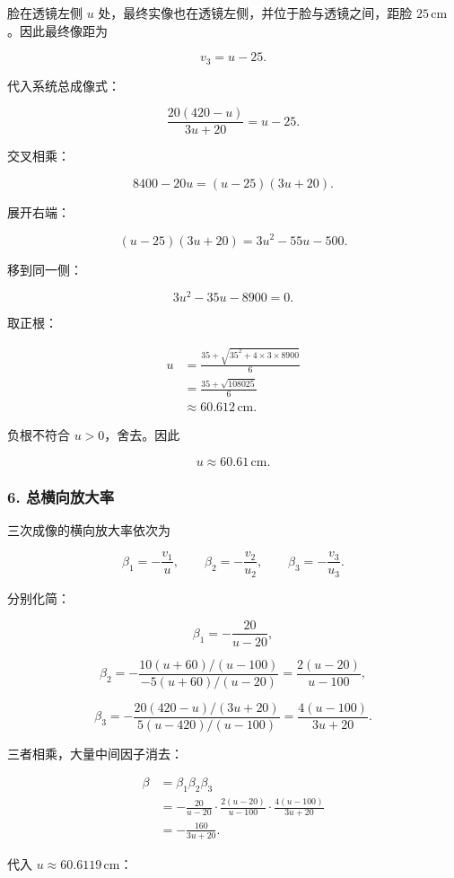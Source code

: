 \documentclass[12pt,a4paper,UTF8]{ctexart}
\begin{document}
脸在透镜左侧 \(u\) 处，最终实像也在透镜左侧，并位于脸与透镜之间，距脸
\(25\,\mathrm{cm}\)。因此最终像距为

\[
v_3=u-25.
\]

代入系统总成像式：

\[
\frac{20(420-u)}{3u+20}=u-25.
\]

交叉相乘：

\[
8400-20u=(u-25)(3u+20).
\]

展开右端：

\[
(u-25)(3u+20)=3u^2-55u-500.
\]

移到同一侧：

\[
3u^2-35u-8900=0.
\]

取正根：

\[
\begin{aligned}
u
&=\frac{35+\sqrt{35^2+4\times3\times8900}}{6}\\
&=\frac{35+\sqrt{108025}}{6}\\
&\approx60.612\,\mathrm{cm}.
\end{aligned}
\]

负根不符合 \(u>0\)，舍去。因此

\[
\boxed{u\approx60.61\,\mathrm{cm}}.
\]

\subsubsection{6.
总横向放大率}\label{ux603bux6a2aux5411ux653eux5927ux7387}

三次成像的横向放大率依次为

\[
\beta_1=-\frac{v_1}{u},
\qquad
\beta_2=-\frac{v_2}{u_2},
\qquad
\beta_3=-\frac{v_3}{u_3}.
\]

分别化简：

\[
\beta_1=-\frac{20}{u-20},
\]

\[
\beta_2
=-\frac{10(u+60)/(u-100)}{-5(u+60)/(u-20)}
=\frac{2(u-20)}{u-100},
\]

\[
\beta_3
=-\frac{20(420-u)/(3u+20)}{5(u-420)/(u-100)}
=\frac{4(u-100)}{3u+20}.
\]

三者相乘，大量中间因子消去：

\[
\begin{aligned}
\beta
&=\beta_1\beta_2\beta_3\\
&=-\frac{20}{u-20}
\cdot\frac{2(u-20)}{u-100}
\cdot\frac{4(u-100)}{3u+20}\\
&=-\frac{160}{3u+20}.
\end{aligned}
\]

代入 \(u\approx60.6119\,\mathrm{cm}\)：
\end{document}
